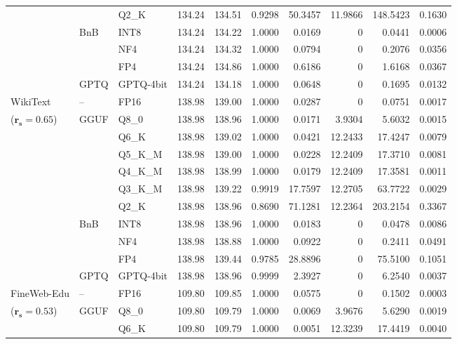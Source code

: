 \begin{longtable}{ll l rrrrrrr}
 &  & Q2\_K & 134.24 & 134.51 & \cellcolor{red!18} 0.9298 & \cellcolor{red!18} 50.3457 & 11.9866 & \cellcolor{red!18} 148.5423 & \cellcolor{red!18} 0.1630 \\
 & BnB & INT8 & 134.24 & 134.22 & 1.0000 & 0.0169 & \cellcolor{cyan!12} $0$ & 0.0441 & 0.0006 \\
 &  & NF4 & 134.24 & 134.32 & 1.0000 & 0.0794 & \cellcolor{cyan!12} $0$ & 0.2076 & 0.0356 \\
 &  & FP4 & 134.24 & 134.86 & 1.0000 & 0.6186 & \cellcolor{cyan!12} $0$ & 1.6168 & 0.0367 \\
 & GPTQ & GPTQ-4bit & 134.24 & 134.18 & 1.0000 & 0.0648 & \cellcolor{cyan!12} $0$ & 0.1695 & 0.0132 \\
\midrule
WikiText & -- & FP16 & 138.98 & 139.00 & 1.0000 & 0.0287 & \cellcolor{cyan!12} $0$ & 0.0751 & 0.0017 \\
{\small ($\mathbf{r_s{=}0.65}$)} & GGUF & Q8\_0 & 138.98 & 138.96 & 1.0000 & 0.0171 & 3.9304 & 5.6032 & 0.0015 \\
 &  & Q6\_K & 138.98 & 139.02 & 1.0000 & 0.0421 & 12.2433 & 17.4247 & 0.0079 \\
 &  & Q5\_K\_M & 138.98 & 139.00 & 1.0000 & 0.0228 & 12.2409 & 17.3710 & 0.0081 \\
 &  & Q4\_K\_M & 138.98 & 138.99 & 1.0000 & 0.0179 & 12.2409 & 17.3581 & 0.0011 \\
 &  & Q3\_K\_M & 138.98 & 139.22 & 0.9919 & 17.7597 & 12.2705 & 63.7722 & 0.0029 \\
 &  & Q2\_K & 138.98 & 138.96 & \cellcolor{red!18} 0.8690 & \cellcolor{red!18} 71.1281 & 12.2364 & \cellcolor{red!18} 203.2154 & \cellcolor{red!18} 0.3367 \\
 & BnB & INT8 & 138.98 & 138.96 & 1.0000 & 0.0183 & \cellcolor{cyan!12} $0$ & 0.0478 & 0.0086 \\
 &  & NF4 & 138.98 & 138.88 & 1.0000 & 0.0922 & \cellcolor{cyan!12} $0$ & 0.2411 & 0.0491 \\
 &  & FP4 & 138.98 & 139.44 & 0.9785 & 28.8896 & \cellcolor{cyan!12} $0$ & 75.5100 & 0.1051 \\
 & GPTQ & GPTQ-4bit & 138.98 & 138.96 & 0.9999 & 2.3927 & \cellcolor{cyan!12} $0$ & 6.2540 & 0.0037 \\
\midrule
FineWeb-Edu & -- & FP16 & 109.80 & 109.85 & 1.0000 & 0.0575 & \cellcolor{cyan!12} $0$ & 0.1502 & 0.0003 \\
{\small ($\mathbf{r_s{=}0.53}$)} & GGUF & Q8\_0 & 109.80 & 109.79 & 1.0000 & 0.0069 & 3.9676 & 5.6290 & 0.0019 \\
 &  & Q6\_K & 109.80 & 109.79 & 1.0000 & 0.0051 & 12.3239 & 17.4419 & 0.0040 \\

\end{longtable}

